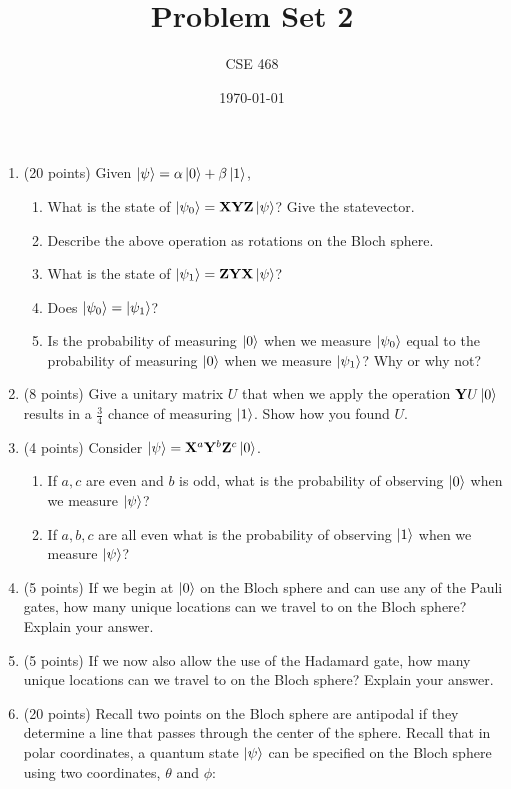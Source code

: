 \documentclass[12pt]{article}
\title{Problem Set 2}
\author{CSE 468}
\date{\today}
\begin{document}
\maketitle

\begin{enumerate}[font=\bfseries]
    \item (20 points) Given $\ket{\psi} = \alpha\ket{0} + \beta\ket{1}$,
    \begin{enumerate}
        \item What is the state of $\ket{\psi_0} = \mathbf{X}\mathbf{Y}\mathbf{Z}\ket{\psi}$? Give the statevector.
        \item Describe the above operation as rotations on the Bloch sphere.
        \item What is the state of $\ket{\psi_1} = \mathbf{Z}\mathbf{Y}\mathbf{X}\ket{\psi}$?
        \item Does $\ket{\psi_0} = \ket{\psi_1}$?
        \item Is the probability of measuring $\ket{0}$ when we measure $\ket{\psi_0}$ equal to the probability of measuring $\ket{0}$ when we measure $\ket{\psi_1}$? Why or why not?
    \end{enumerate}
    \item (8 points) Give a unitary matrix $U$ that when we apply the operation $\mathbf{Y}U\ket{0}$ results in a $\frac{3}{4}$ chance of measuring $\ket{1}$. Show how you found $U$.
    \item (4 points) Consider $\ket{\psi} = \mathbf{X}^a\mathbf{Y}^b\mathbf{Z}^c\ket{0}$.
    \begin{enumerate}
        \item If $a,c$ are even and $b$ is odd, what is the probability of observing $\ket{0}$ when we measure $\ket{\psi}$?
        \item If $a,b,c$ are all even what is the probability of observing $\ket{1}$ when we measure $\ket{\psi}$?
    \end{enumerate}
    \item (5 points) If we begin at $\ket{0}$ on the Bloch sphere and can use any of the Pauli gates, how many unique locations can we travel to on the Bloch sphere? Explain your answer.
    \item (5 points) If we now also allow the use of the Hadamard gate, how many unique locations can we travel to on the Bloch sphere? Explain your answer.
    \item (20 points) Recall two points on the Bloch sphere are antipodal if they determine a line that passes through the center of the sphere. Recall that in polar coordinates, a quantum state $\ket{\psi}$ can be specified on the Bloch sphere using two coordinates, $\theta$ and $\phi$:

\end{enumerate}
\end{document}
